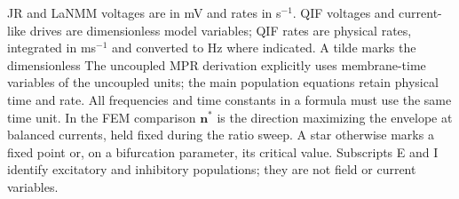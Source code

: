 \documentclass[11pt,a4paper]{article}
\newif\ifjne
\newif\ifsupp
\newif\ifappendices
\providecommand{\DIFaddtex}[1]{{\protect\color{blue} \sf #1}} %
\providecommand{\DIFdeltex}[1]{{\protect\color{red} \scriptsize #1}} %
\providecommand{\DIFaddbegin}{} %
\providecommand{\DIFaddend}{} %
\providecommand{\DIFdelbegin}{} %
\providecommand{\DIFdelend}{} %
\providecommand{\DIFadd}[1]{\texorpdfstring{\DIFaddtex{#1}}{#1}} %
\providecommand{\DIFdel}[1]{\texorpdfstring{\DIFdeltex{#1}}{}} %
\begin{document}
\fi
\DIFaddbegin \ifsupp\DIFaddend \clearpage\DIFaddbegin \else\ifjne\else\clearpage\fi\fi
\DIFaddend \appendix
\DIFdelbegin %
\DIFdelend \ifsupp
\DIFdelbegin \section{\DIFdel{Notation and units}}%
\addtocounter{section}{-1}%
\DIFdelend \DIFaddbegin \section*{\DIFadd{Notation and units}}\phantomsection\DIFaddend \label{app:notation-supp}
\def\notationtablelabel{tab:notation-supp}
\DIFdelbegin %
\section{\DIFdel{Notation and units}}%
\addtocounter{section}{-1}%
\DIFdelend %
Table~\ref{\notationtablelabel} groups the symbols by their role in the calculation.
\DIFaddbegin \ifappendices\else {}\fi\space
\DIFaddend JR and LaNMM voltages are in mV and rates in s$^{-1}$. QIF voltages and current-like
drives are dimensionless model variables; QIF rates are physical rates, integrated
in ms$^{-1}$ and converted to Hz where indicated. \DIFdelbegin \DIFdel{A tilde marks the dimensionless
}\DIFdelend \DIFaddbegin \DIFadd{The uncoupled MPR derivation explicitly uses }\DIFaddend membrane-time \DIFdelbegin \DIFdel{variables of the uncoupled }\DIFdelend \DIFaddbegin \DIFadd{units; the main
population equations retain physical time and rate. All frequencies and time
constants in a formula must use the same time unit. In the FEM comparison $\mathbf n^*$ is the direction maximizing the envelope
at balanced currents, held fixed during the ratio sweep. A star otherwise marks a fixed point or,
on a bifurcation parameter, its critical value. Subscripts E and I identify
excitatory and inhibitory populations; they are not field or current variables.
}
\end{document}
